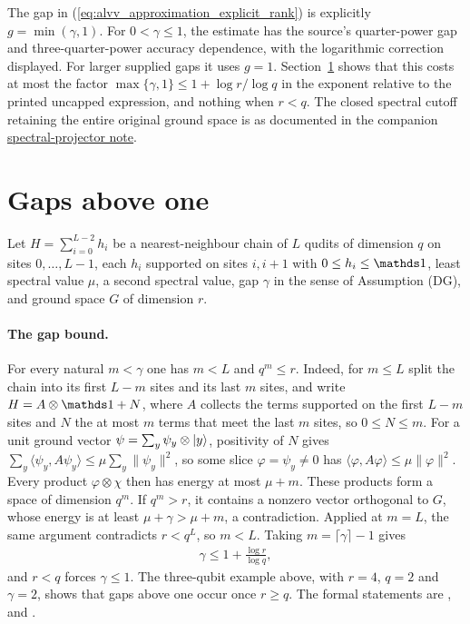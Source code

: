 \documentclass{article}
\begin{document}
The gap in (\ref{eq:alvv_approximation_explicit_rank}) is explicitly
$g=\min(\gamma,1)$. For $0<\gamma\le1$, the estimate has the source's
quarter-power gap and three-quarter-power accuracy dependence, with the
logarithmic correction displayed. For larger supplied gaps it uses $g=1$.
Section~\ref{sec:large_gap} shows that this costs at most the factor
$\max\{\gamma,1\}\le1+\log r/\log q$ in the exponent relative to the
printed uncapped expression, and nothing when $r<q$.
The closed spectral cutoff retaining the entire original ground space is
as documented in the companion
\href{https://sirui-lu.com/QICLean/paper-gaps/alvv16_spectral_projector_boundary.pdf}
{spectral-projector note}.


\section{Gaps above one}
\label{sec:large_gap}

Let $H=\sum_{i=0}^{L-2}h_i$ be a nearest-neighbour chain of $L$ qudits of
dimension $q$ on sites $0,\dots,L-1$, each $h_i$ supported on sites $i,i+1$
with $0\le h_i\le\Id$, least spectral value $\mu$, a second
spectral value, gap $\gamma$ in the sense of Assumption (DG), and ground
space $G$ of dimension $r$.

\paragraph{The gap bound.} For every natural $m<\gamma$ one has $m<L$ and
$q^m\le r$. Indeed, for $m\le L$ split the chain into its first $L-m$ sites
and its last $m$ sites, and write $H=A\otimes\Id+N$, where $A$ collects the
terms supported on the first $L-m$ sites and $N$ the at most $m$ terms that
meet the last $m$ sites, so $0\le N\le m$. For a unit ground vector
$\psi=\sum_y\psi_y\otimes|y\rangle$, positivity of $N$ gives
$\sum_y\langle\psi_y,A\psi_y\rangle\le\mu\sum_y\|\psi_y\|^2$, so some slice
$\varphi=\psi_y\ne0$ has $\langle\varphi,A\varphi\rangle\le\mu\|\varphi\|^2$.
Every product $\varphi\otimes\chi$ then has energy at most $\mu+m$. These
products form a space of dimension $q^m$. If $q^m>r$, it contains a nonzero
vector orthogonal to $G$, whose energy is at least $\mu+\gamma>\mu+m$, a
contradiction. Applied at $m=L$, the same argument contradicts $r<q^L$, so
$m<L$. Taking $m=\lceil\gamma\rceil-1$ gives
\begin{align}
    \gamma\le1+\frac{\log r}{\log q},
    \label{eq:alvv_approximation_gap_log_bound}
\end{align}
and $r<q$ forces $\gamma\le1$. The three-qubit example above, with $r=4$,
$q=2$ and $\gamma=2$, shows that gaps above one occur once $r\ge q$.
The formal statements are
,
 and
.
\end{document}
